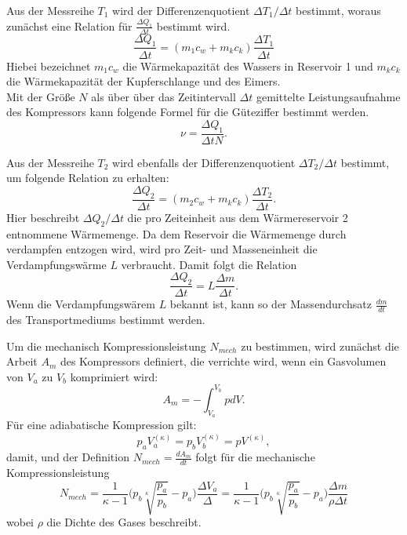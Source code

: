 Aus der Messreihe $T_{1}$ wird der Differenzenquotient $\Delta T_{1}/\Delta t$ bestimmt,
woraus zunächst eine Relation für $\frac{\Delta Q_{1}}{\Delta t}$ bestimmt wird.
\begin{equation}
  \frac{\Delta Q_{1}}{\Delta {t}}=(m_{1}c_{w}+m_{k}c_{k})\frac{\Delta T_{1}}{\Delta t}
\end{equation}
Hiebei bezeichnet $m_{1}c_{w}$ die Wärmekapazität des Wassers in Reservoir 1 und $m_{k}c_{k}$ die
Wärmekapazität der Kupferschlange und des Eimers.\\
Mit der Größe $N$ als über über das Zeitintervall $\Delta t$ gemittelte Leistungsaufnahme des Kompressors
kann folgende Formel für die Güteziffer bestimmt werden.
\begin{equation}
  \nu = \frac{\Delta Q_{1}}{\Delta t N}.
  \label{güte3}
\end{equation}

Aus der Messreihe $T_{2}$ wird ebenfalls der Differenzenquotient $\Delta T_{2}/\Delta t$
bestimmt, um folgende Relation zu erhalten:
\begin{equation}
  \frac{\Delta Q_{2}}{\Delta {t}}=(m_{2}c_{w}+m_{k}c_{k})\frac{\Delta T_{2}}{\Delta t}.
\end{equation}
Hier beschreibt $\Delta Q_{2}/{\Delta t}$ die pro Zeiteinheit aus dem Wärmereservoir 2
entnommene Wärmemenge.
Da dem Reservoir die Wärmemenge durch verdampfen entzogen wird, wird pro Zeit- und Masseneinheit
die Verdampfungswärme $L$ verbraucht. Damit folgt die Relation
\begin{equation}
  \frac{\Delta Q_{2}}{\Delta t}= L \frac{\Delta m}{\Delta t}.
\end{equation}
Wenn die Verdampfungswärem $L $ bekannt ist, kann so der Massendurchsatz $\frac{dm}{dt}$ des Transportmediums
bestimmt werden.

Um die mechanisch Kompressionsleistung $N_{mech}$ zu bestimmen, wird zunächst die
Arbeit $A_{m}$ des Kompressors definiert, die verrichte wird, wenn ein Gasvolumen von $V_{a}$ zu $V_{b}$
komprimiert wird:
\begin{equation}
  A_{m}= -\int_{V_{a}}^{V_{b}} p dV.
\end{equation}
Für eine adiabatische Kompression gilt:
\begin{equation}
  p_{a}V_{a}^{(\kappa)}=p_{b}V_{b}^{(\kappa)}=pV^{(\kappa)},
\end{equation}
damit, und der Definition $N_{mech}=\frac{dA_{m}}{dt}$ folgt für die mechanische Kompressionsleistung
\begin{equation}
  N_{mech}= \frac{1}{\kappa-1}\Biggl(p_{b}\sqrt[\kappa]{\frac{p_{a}}{p_{b}}}-p_{a}\Biggr)\frac{\Delta V_{a}}{\Delta }=\frac{1}{\kappa-1}\Biggl(p_{b}\sqrt[\kappa]{\frac{p_{a}}{p_{b}}}-p_{a}\Biggr)\frac{\Delta m}{\rho \Delta t}
 \label{eqn:Nmech}
\end{equation}
wobei $\rho$ die Dichte des Gases beschreibt.

\label{sec:Theorie}

